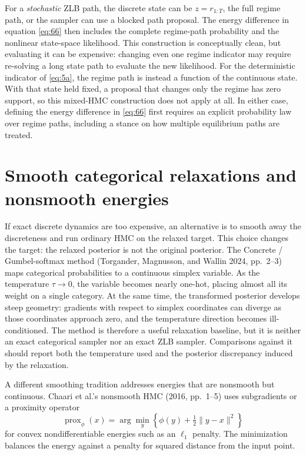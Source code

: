 \documentclass[11pt]{article}
\begin{document}
For a \emph{stochastic} ZLB path, the discrete state can be $z=r_{1:T}$, the full regime path, or the sampler can use a blocked path proposal. The energy difference in equation \eqref{eq:66} then includes the complete regime-path probability and the nonlinear state-space likelihood. This construction is conceptually clean, but evaluating it can be expensive: changing even one regime indicator may require re-solving a long state path to evaluate the new likelihood. For the deterministic indicator of \eqref{eq:5a}, the regime path is instead a function of the continuous state. With that state held fixed, a proposal that changes only the regime has zero support, so this mixed-HMC construction does not apply at all. In either case, defining the energy difference in \eqref{eq:66} first requires an explicit probability law over regime paths, including a stance on how multiple equilibrium paths are treated.

\section{Smooth categorical relaxations and nonsmooth energies}\label{sec:relaxations}

If exact discrete dynamics are too expensive, an alternative is to smooth away the discreteness and run ordinary HMC on the relaxed target. This choice changes the target: the relaxed posterior is not the original posterior. The Concrete / Gumbel-softmax method (Torgander, Magnusson, and Wallin 2024, pp.~2--3) maps categorical probabilities to a continuous simplex variable. As the temperature $\tau\to0$, the variable becomes nearly one-hot, placing almost all its weight on a single category. At the same time, the transformed posterior develops steep geometry: gradients with respect to simplex coordinates can diverge as those coordinates approach zero, and the temperature direction becomes ill-conditioned. The method is therefore a useful relaxation baseline, but it is neither an exact categorical sampler nor an exact ZLB sampler. Comparisons against it should report both the temperature used and the posterior discrepancy induced by the relaxation.

A different smoothing tradition addresses energies that are nonsmooth but continuous. Chaari et al.'s nonsmooth HMC (2016, pp.~1--5) uses subgradients or a proximity operator
\begin{equation}\label{eq:68}
 \operatorname{prox}_{\phi}(x)=
 \arg\min_y\left\{\phi(y)+\tfrac12\|y-x\|^2\right\}
\end{equation}
for convex nondifferentiable energies such as an $\ell_1$ penalty. The minimization balances the energy against a penalty for squared distance from the input point.
\end{document}
